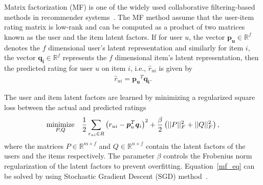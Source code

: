 Matrix factorization (MF) is one of the widely used collaborative
filtering-based methods 
in recommender systems~\cite{hu2008collaborative,koren2008factorization,koren2010collaborative,koren2009matrix}. 
The  MF method assume that the
user-item rating matrix is low-rank and can be computed as a product of two
matrices known as the user and the item latent factors. 
If for user $u$, the vector $\bm{p_u} \in \mathbb{R}^f$ denotes the $f$ dimensional
user's latent representation and similarly for item $i$, the vector 
$\bm{q_i} \in \mathbb{R}^f$ represents the $f$ dimensional item's latent
representation, then the
predicted rating for user $u$ on item $i$, i.e., $\hat{r}_{ui}$ is given by
%
\begin{equation} \label{mf_eq}
  \begin{split}
    \hat{r}_{ui} = \bm{p_u}^T\bm{q_i}.
  \end{split}
\end{equation}


The user and item latent factors are learned by minimizing a regularized
square loss between the actual and predicted ratings 
\begin{equation}
  \begin{aligned}
    \operatornamewithlimits{minimize}_{P, Q} & &\frac{1}{2}\sum_{r_{ui} \in R}
    \left(r_{ui} - \bm{p}_u^T \bm{q}_i \right)^2+ \frac{\beta}{2}
    \left(||P||_F^2 + ||Q||_F^2 \right),
  \end{aligned}
\end{equation}
where the matrices $P \in \mathbb{R}^{m \times f}$ and $Q \in\mathbb{R}^{n \times f}$ 
contain the latent factors of the users and the items
respectively. The parameter $\beta$ controls the Frobenius norm regularization
of the latent factors to prevent overfitting. 
Equation~\ref{mf_eq} can be solved by using Stochastic Gradient Descent (SGD)
method~\cite{koren2009matrix}.

\iffalse
Since naive SGD is not easy to parallelize and does not scale for large datasets, a
variety of methods have been proposed to parallelize
SGD~\cite{gemulla2011large,recht2011hogwild,recht2013parallel}.
Alternating Least Squares (ALS)~\cite{zhou2008large} and CCD++~\cite{yu2012scalable} 
can also be used for matrix factorization, and unlike SGD these
schemes are inherently suitable for parallelization.
\fi
